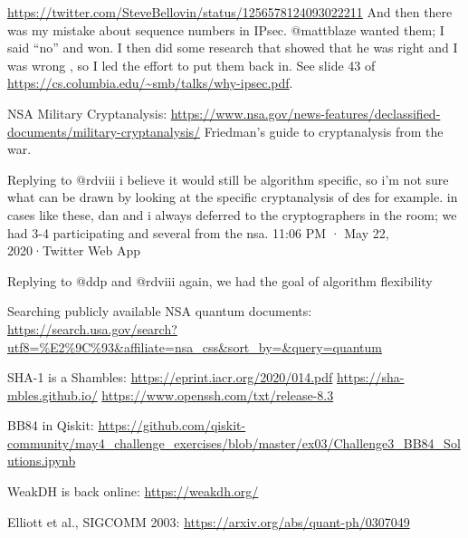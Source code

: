 \documentclass[%
 aip,
 jmp,%
 amsmath,amssymb,
 reprint,%
]{revtex4-1}
\begin{document}
\url{https://twitter.com/SteveBellovin/status/1256578124093022211}
And then there was my mistake about sequence numbers in IPsec. 
@mattblaze
 wanted them; I said “no” and won. I then did some research that
 showed that he was right and I was wrong , so I led the effort to put
 them back in. See slide 43 of
\url{https://cs.columbia.edu/~smb/talks/why-ipsec.pdf}.

NSA Military Cryptanalysis:
\url{https://www.nsa.gov/news-features/declassified-documents/military-cryptanalysis/}
Friedman's guide to cryptanalysis from the war.

Replying to 
@rdviii
i believe it would still be algorithm specific, so i'm not sure what can be drawn by looking at the specific cryptanalysis of des for example.  in cases like these, dan and i always deferred to the cryptographers in the room; we had 3-4 participating and several from the nsa.
11:06 PM · May 22, 2020·Twitter Web App

Replying to 
@ddp
 and 
@rdviii
again, we had the goal of algorithm flexibility

Searching publicly available NSA quantum documents:
\url{https://search.usa.gov/search?utf8=%E2%9C%93&affiliate=nsa_css&sort_by=&query=quantum}

SHA-1 is a Shambles:
\url{https://eprint.iacr.org/2020/014.pdf}
\url{https://sha-mbles.github.io/}
\url{https://www.openssh.com/txt/release-8.3}

BB84 in Qiskit:
\url{https://github.com/qiskit-community/may4_challenge_exercises/blob/master/ex03/Challenge3_BB84_Solutions.ipynb}

WeakDH is back online:
\url{https://weakdh.org/}

Elliott et al., SIGCOMM 2003:
\url{https://arxiv.org/abs/quant-ph/0307049}
\end{document}
